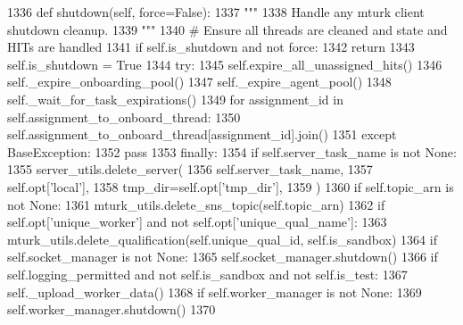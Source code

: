 \begin{DoxyCode}
1336     \textcolor{keyword}{def }shutdown(self, force=False):
1337         \textcolor{stringliteral}{"""}
1338 \textcolor{stringliteral}{        Handle any mturk client shutdown cleanup.}
1339 \textcolor{stringliteral}{        """}
1340         \textcolor{comment}{# Ensure all threads are cleaned and state and HITs are handled}
1341         \textcolor{keywordflow}{if} self.is\_shutdown \textcolor{keywordflow}{and} \textcolor{keywordflow}{not} force:
1342             \textcolor{keywordflow}{return}
1343         self.is\_shutdown = \textcolor{keyword}{True}
1344         \textcolor{keywordflow}{try}:
1345             self.expire\_all\_unassigned\_hits()
1346             self.\_expire\_onboarding\_pool()
1347             self.\_expire\_agent\_pool()
1348             self.\_wait\_for\_task\_expirations()
1349             \textcolor{keywordflow}{for} assignment\_id \textcolor{keywordflow}{in} self.assignment\_to\_onboard\_thread:
1350                 self.assignment\_to\_onboard\_thread[assignment\_id].join()
1351         \textcolor{keywordflow}{except} BaseException:
1352             \textcolor{keywordflow}{pass}
1353         \textcolor{keywordflow}{finally}:
1354             \textcolor{keywordflow}{if} self.server\_task\_name \textcolor{keywordflow}{is} \textcolor{keywordflow}{not} \textcolor{keywordtype}{None}:
1355                 server\_utils.delete\_server(
1356                     self.server\_task\_name,
1357                     self.opt[\textcolor{stringliteral}{'local'}],
1358                     tmp\_dir=self.opt[\textcolor{stringliteral}{'tmp\_dir'}],
1359                 )
1360             \textcolor{keywordflow}{if} self.topic\_arn \textcolor{keywordflow}{is} \textcolor{keywordflow}{not} \textcolor{keywordtype}{None}:
1361                 mturk\_utils.delete\_sns\_topic(self.topic\_arn)
1362             \textcolor{keywordflow}{if} self.opt[\textcolor{stringliteral}{'unique\_worker'}] \textcolor{keywordflow}{and} \textcolor{keywordflow}{not} self.opt[\textcolor{stringliteral}{'unique\_qual\_name'}]:
1363                 mturk\_utils.delete\_qualification(self.unique\_qual\_id, self.is\_sandbox)
1364             \textcolor{keywordflow}{if} self.socket\_manager \textcolor{keywordflow}{is} \textcolor{keywordflow}{not} \textcolor{keywordtype}{None}:
1365                 self.socket\_manager.shutdown()
1366             \textcolor{keywordflow}{if} self.logging\_permitted \textcolor{keywordflow}{and} \textcolor{keywordflow}{not} self.is\_sandbox \textcolor{keywordflow}{and} \textcolor{keywordflow}{not} self.is\_test:
1367                 self.\_upload\_worker\_data()
1368             \textcolor{keywordflow}{if} self.worker\_manager \textcolor{keywordflow}{is} \textcolor{keywordflow}{not} \textcolor{keywordtype}{None}:
1369                 self.worker\_manager.shutdown()
1370 
\end{DoxyCode}
